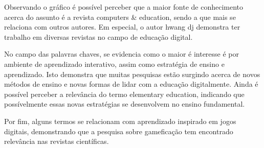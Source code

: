Observando o gráfico é possível perceber que a maior fonte de conhecimento acerca do assunto é a revista computers & education, sendo a que mais se relaciona com outros autores. Em especial, o autor hwang dj demonstra ter trabalho em diversas revistas no campo de educação digital.

No campo das palavras chaves, se evidencia como o maior é interesse é por ambiente de aprendizado interativo, assim como estratégia de ensino e aprendizado. Isto demonstra que muitas pesquisas estão surgindo acerca de novos métodos de ensino e novas formas de lidar com a educação digitalmente. Ainda é possível perceber a relevância do termo elementary education, indicando que possívelmente essas novas estratégias se desenvolvem no ensino fundamental.

Por fim, alguns termos se relacionam com aprendizado inspirado em jogos digitais, demonstrando que a pesquisa sobre gameficação tem encontrado relevância nas revistas científicas.



